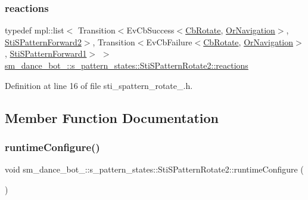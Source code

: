 \subsubsection{\texorpdfstring{reactions}{reactions}}
{\footnotesize\ttfamily typedef mpl\+::list$<$ Transition$<$Ev\+Cb\+Success$<$\hyperlink{classcl__move__base__z_1_1CbRotate}{Cb\+Rotate}, \hyperlink{classsm__dance__bot__2_1_1OrNavigation}{Or\+Navigation}$>$, \hyperlink{structsm__dance__bot__2_1_1s__pattern__states_1_1StiSPatternForward2}{Sti\+S\+Pattern\+Forward2}$>$, Transition$<$Ev\+Cb\+Failure$<$\hyperlink{classcl__move__base__z_1_1CbRotate}{Cb\+Rotate}, \hyperlink{classsm__dance__bot__2_1_1OrNavigation}{Or\+Navigation}$>$, \hyperlink{structsm__dance__bot__2_1_1s__pattern__states_1_1StiSPatternForward1}{Sti\+S\+Pattern\+Forward1}$>$ $>$ \hyperlink{structsm__dance__bot__2_1_1s__pattern__states_1_1StiSPatternRotate2_a90493c711e97af34e0db4fbaa87ba3e8}{sm\+\_\+dance\+\_\+bot\+\_\+::s\+\_\+pattern\+\_\+states\+::\+Sti\+S\+Pattern\+Rotate2\+::reactions}}



Definition at line 16 of file sti\+\_\+spattern\+\_\+rotate\+\_.\+h.



\subsection{Member Function Documentation}
\mbox{\label{structsm__dance__bot__2_1_1s__pattern__states_1_1StiSPatternRotate2_a3f8fea0574a061fda5ed68ec8ad096a9}} 
\subsubsection{\texorpdfstring{runtime\+Configure()}{runtimeConfigure()}}
{\footnotesize\ttfamily void sm\+\_\+dance\+\_\+bot\+\_\+::s\+\_\+pattern\+\_\+states\+::\+Sti\+S\+Pattern\+Rotate2\+::runtime\+Configure (\begin{DoxyParamCaption}{ }\end{DoxyParamCaption})\hspace{0.3cm}{\ttfamily [inline]}}



